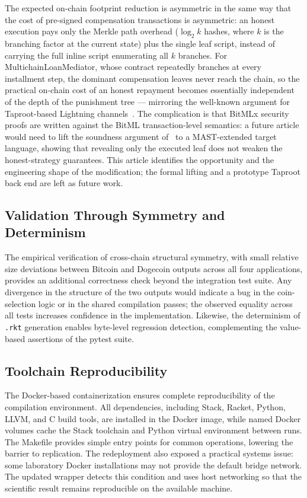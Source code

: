 \documentclass[journal]{IEEEtran}
\begin{document}
The expected on-chain footprint reduction is asymmetric in the same way that the cost of pre-signed compensation transactions is asymmetric: an honest execution pays only the Merkle path overhead ($\log_2 k$ hashes, where $k$ is the branching factor at the current state) plus the single leaf script, instead of carrying the full inline script enumerating all $k$ branches. For MultichainLoanMediator, whose contract repeatedly branches at every installment step, the dominant compensation leaves never reach the chain, so the practical on-chain cost of an honest repayment becomes essentially independent of the depth of the punishment tree --- mirroring the well-known argument for Taproot-based Lightning channels~\cite{poon2016bitcoin}. The complication is that BitMLx security proofs are written against the BitML transaction-level semantics: a future article would need to lift the soundness argument of~\cite{engel2025bitmlx} to a MAST-extended target language, showing that revealing only the executed leaf does not weaken the honest-strategy guarantees. This article identifies the opportunity and the engineering shape of the modification; the formal lifting and a prototype Taproot back end are left as future work.

\subsection{Validation Through Symmetry and Determinism}

The empirical verification of cross-chain structural symmetry, with small relative size deviations between Bitcoin and Dogecoin outputs across all four applications, provides an additional correctness check beyond the integration test suite. Any divergence in the structure of the two outputs would indicate a bug in the coin-selection logic or in the shared compilation passes; the observed equality across all tests increases confidence in the implementation. Likewise, the determinism of \texttt{.rkt} generation enables byte-level regression detection, complementing the value-based assertions of the pytest suite.

\subsection{Toolchain Reproducibility}

The Docker-based containerization ensures complete reproducibility of the compilation environment. All dependencies, including Stack, Racket, Python, LLVM, and C build tools, are installed in the Docker image, while named Docker volumes cache the Stack toolchain and Python virtual environment between runs. The Makefile provides simple entry points for common operations, lowering the barrier to replication. The redeployment also exposed a practical systems issue: some laboratory Docker installations may not provide the default bridge network. The updated wrapper detects this condition and uses host networking so that the scientific result remains reproducible on the available machine.
\end{document}
